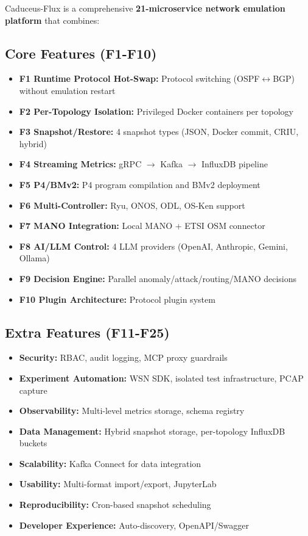 \documentclass[10pt,a4paper]{article}
\begin{document}
Caduceus-Flux is a comprehensive \textbf{21-microservice network emulation platform} that combines:

\subsection{Core Features (F1-F10)}
\begin{itemize}
\item \textbf{F1 Runtime Protocol Hot-Swap:} Protocol switching (OSPF$\leftrightarrow$BGP) without emulation restart
\item \textbf{F2 Per-Topology Isolation:} Privileged Docker containers per topology
\item \textbf{F3 Snapshot/Restore:} 4 snapshot types (JSON, Docker commit, CRIU, hybrid)
\item \textbf{F4 Streaming Metrics:} gRPC $\to$ Kafka $\to$ InfluxDB pipeline
\item \textbf{F5 P4/BMv2:} P4 program compilation and BMv2 deployment
\item \textbf{F6 Multi-Controller:} Ryu, ONOS, ODL, OS-Ken support
\item \textbf{F7 MANO Integration:} Local MANO + ETSI OSM connector
\item \textbf{F8 AI/LLM Control:} 4 LLM providers (OpenAI, Anthropic, Gemini, Ollama)
\item \textbf{F9 Decision Engine:} Parallel anomaly/attack/routing/MANO decisions
\item \textbf{F10 Plugin Architecture:} Protocol plugin system
\end{itemize}

\subsection{Extra Features (F11-F25)}
\begin{itemize}
\item \textbf{Security:} RBAC, audit logging, MCP proxy guardrails
\item \textbf{Experiment Automation:} WSN SDK, isolated test infrastructure, PCAP capture
\item \textbf{Observability:} Multi-level metrics storage, schema registry
\item \textbf{Data Management:} Hybrid snapshot storage, per-topology InfluxDB buckets
\item \textbf{Scalability:} Kafka Connect for data integration
\item \textbf{Usability:} Multi-format import/export, JupyterLab
\item \textbf{Reproducibility:} Cron-based snapshot scheduling
\item \textbf{Developer Experience:} Auto-discovery, OpenAPI/Swagger
\end{itemize}
\end{document}
